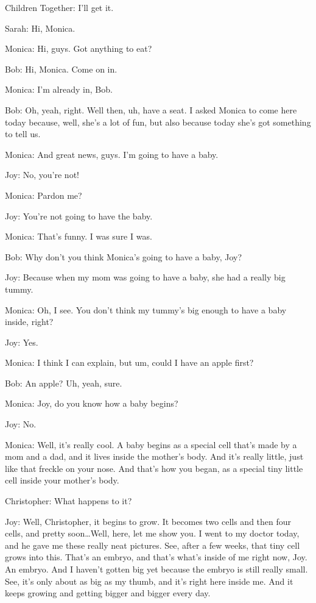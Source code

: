 Children Together: I'll get it.

Sarah: Hi, Monica.

Monica: Hi, guys. Got anything to eat?

Bob: Hi, Monica. Come on in.

Monica: I'm already in, Bob.

Bob: Oh, yeah, right. Well then, uh, have a seat. I asked Monica to come here today because, well, she's a lot of fun, but also because today she's got something to tell us.

Monica: And great news, guys. I'm going to have a baby.

Joy: No, you're not!

Monica: Pardon me?

Joy: You're not going to have the baby.

Monica: That's funny. I was sure I was.

Bob: Why don't you think Monica's going to have a baby, Joy?

Joy: Because when my mom was going to have a baby, she had a really big tummy.

Monica: Oh, I see. You don't think my tummy's big enough to have a baby inside, right?

Joy: Yes.

Monica: I think I can explain, but um, could I have an apple first?

Bob: An apple? Uh, yeah, sure.

Monica: Joy, do you know how a baby begins?

Joy: No.

Monica: Well, it's really cool. A baby begins as a special cell that's made by a mom and a dad, and it lives inside the mother's body. And it's really little, just like that freckle on your nose. And that's how you began, as a special tiny little cell inside your mother's body.

Christopher: What happens to it?

Joy: Well, Christopher, it begins to grow. It becomes two cells and then four cells, and pretty soon\dots Well, here, let me show you. I went to my doctor today, and he gave me these really neat pictures. See, after a few weeks, that tiny cell grows into this. That's an embryo, and that's what's inside of me right now, Joy. An embryo. And I haven't gotten big yet because the embryo is still really small. See, it's only about as big as my thumb, and it's right here inside me. And it keeps growing and getting bigger and bigger every day.


